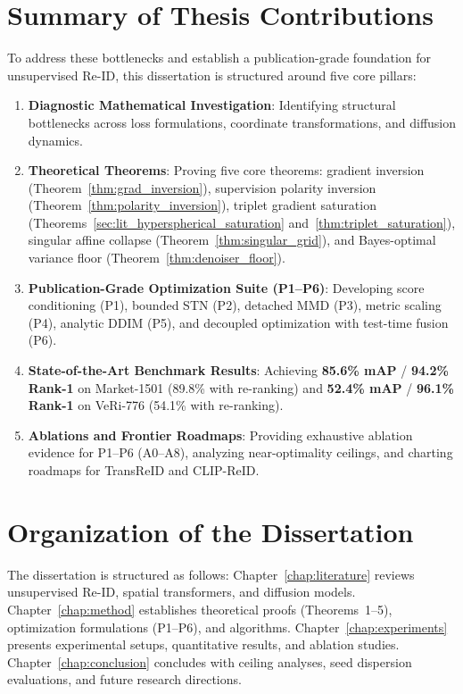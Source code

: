 \section{Summary of Thesis Contributions}
\label{sec:six_pillars}
\label{sec:contributions}

To address these bottlenecks and establish a publication-grade foundation for unsupervised Re-ID, this dissertation is structured around five core pillars:
\begin{enumerate}[itemsep=0.5pt,parsep=0pt,topsep=1.0pt,leftmargin=*]
    \item \textbf{Diagnostic Mathematical Investigation}: Identifying structural bottlenecks across loss formulations, coordinate transformations, and diffusion dynamics.
    \item \textbf{Theoretical Theorems}: Proving five core theorems: gradient inversion (Theorem~\ref{thm:grad_inversion}), supervision polarity inversion (Theorem~\ref{thm:polarity_inversion}), triplet gradient saturation (Theorems~\ref{sec:lit_hyperspherical_saturation} and~\ref{thm:triplet_saturation}), singular affine collapse (Theorem~\ref{thm:singular_grid}), and Bayes-optimal variance floor (Theorem~\ref{thm:denoiser_floor}).
    \item \textbf{Publication-Grade Optimization Suite (P1--P6)}: Developing score conditioning (P1), bounded STN (P2), detached MMD (P3), metric scaling (P4), analytic DDIM (P5), and decoupled optimization with test-time fusion (P6).
    \item \textbf{State-of-the-Art Benchmark Results}: Achieving \textbf{85.6\% mAP} / \textbf{94.2\% Rank-1} on Market-1501 (89.8\% with re-ranking) and \textbf{52.4\% mAP} / \textbf{96.1\% Rank-1} on VeRi-776 (54.1\% with re-ranking).
    \item \textbf{Ablations and Frontier Roadmaps}: Providing exhaustive ablation evidence for P1--P6 (A0--A8), analyzing near-optimality ceilings, and charting roadmaps for TransReID and CLIP-ReID.
\end{enumerate}

\section{Organization of the Dissertation}
\label{sec:outline}

The dissertation is structured as follows: Chapter~\ref{chap:literature} reviews unsupervised Re-ID, spatial transformers, and diffusion models. Chapter~\ref{chap:method} establishes theoretical proofs (Theorems~1--5), optimization formulations (P1--P6), and algorithms. Chapter~\ref{chap:experiments} presents experimental setups, quantitative results, and ablation studies. Chapter~\ref{chap:conclusion} concludes with ceiling analyses, seed dispersion evaluations, and future research directions.
